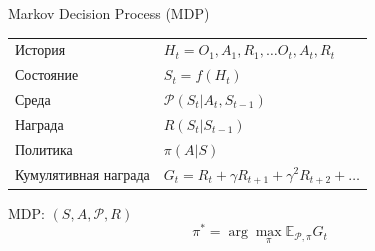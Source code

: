 \documentclass[11pt,aspectratio=169,handout]{beamer}
\begin{document}
\begin{frame}{Markov Decision Process (MDP)}

\begin{small}

\begin{tabular}{l l}
История & $H_t = O_1, A_1, R_1, \ldots O_t, A_t, R_t$ \\
\pause Состояние & $S_t = f(H_t)$ \\
\pause Среда & $\mathcal{P}(S_t | A_{t}, S_{t-1})$ \\
\pause Награда & $R(S_t | S_{t-1})$ \\
\pause Политика & $\pi(A | S)$ \\
\pause Кумулятивная награда & $G_t = R_t + \gamma R_{t+1} + \gamma^2 R_{t+2} + \ldots$
\end{tabular}

\end{small}

\vfill

\pause
\begin{tcolorbox}[colback=info!5,colframe=info!80,title=Цель: выбрать оптимальную политику]
MDP: $(S,A,\mathcal{P},R)$
\[
\pi^* = \arg \max_{\pi} \mathbb{E}_{\mathcal{P}, \pi} G_t
\]
\end{tcolorbox}

\end{frame}
\end{document}
